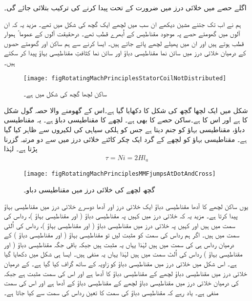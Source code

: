 اگلے حصے میں خلائی درز میں ضرورت کے تحت   پیدا کرنے کی ترکیب بتلائی جائے گی۔

ہم نے اب تک جتنے مشین دیکھے ان سب میں لچھے ایک گچھ کی شکل میں تھے۔ مزید یہ کہ ان آلوں میں گھومتے حصے پہ موجود مقناطیس کے اُبھرے قطب تھے۔ درحقیقت آلوں کے عموما ً ہموار قطب ہوتے ہیں اور ان میں پھیلے لچھے پائے جاتے ہیں۔ ایسا کرنے سے ہم ساکن اور گھومتے حصوں کے درمیان خلائی درز میں سائن نما مقناطیسی دباؤ اور سائن نما  کثافتِ مقناطیسی بہاؤ پیدا کر سکتے ہیں۔ 
\begin{figure}
\centering
\texttt{[image: figRotatingMachPrinciplesStatorCoilNotDistributed]}
\caption{ساکن لچھا گچھ کی شکل میں ہے۔}
\label{شکل_گھومتے_مشین_گچھ_لچھا}
\end{figure}

شکل   میں ایک لچھا گچھ کی شکل کا دکھایا گیا ہے۔اس کے گھومنے والا حصہ گول شکل کا ہے اور اس کا  ہے۔ساکن حصے کا بھی  ہے۔ لچھے کا مقناطیسی دباؤ  ہے۔  یہ مقناطیسی دباؤ، مقناطیسی بہاؤ   کو جنم دیتا ہے جس کو ہلکی سیاہی کی  لکیروں سے ظاہر کیا گیا ہے۔ مقناطیسی بہاؤ کو لچھے کے گرد ایک چکر کاٹتے خلائی درز میں سے دو مرتبہ گزرنا پڑتا ہے۔ لہٰذا
\begin{align}
\tau=N i=2 H l_a
\end{align}
%
\begin{figure}
\centering
\texttt{[image: figRotatingMachPrinciplesMMFjumpsAtDotAndCross]}
\caption{گچھ لچھے کی خلائی درز میں مقناطیسی دباو۔}
\label{شکل_گھومتے_مشین_گچھ_لچھے_کا_دباو}
\end{figure}

یوں ساکن لچھے کا آدھا مقناطیسی دباؤ ایک خلائی درز اور آدھا دوسرے خلائی درز میں مقناطیسی بہاؤ پیدا کرتا ہے۔ مزید یہ کہ خلائی درز میں کہیں پہ مقناطیسی دباؤ ( اور  مقناطیسی بہاؤ )،  رداس کی سمت میں ہیں اور کہیں  پہ خلائی درز میں مقناطیسی دباؤ ( اور مقناطیسی بہاؤ )، رداس کی اُلٹی سمت میں ہیں۔ اگر ہم رداس کی سمت کو مثبت لیں تو   مقناطیسی بہاؤ ( اور مقناطیسی دباؤ )  کے درمیان رداس ہی کی  سمت میں ہیں لہٰذا یہاں  یہ مثبت ہیں جبکہ باقی جگہ  مقناطیسی دباؤ ( اور مقناطیسی بہاؤ ) رداس کی اُلٹ سمت میں ہیں لہٰذا یہاں یہ منفی ہیں۔ ایسا ہی شکل   میں دکھایا گیا ہے۔ اس شکل میں خلائی درز میں مقناطیسی دباؤ کو زاویہ کے ساتھ گراف کیا گیا ہے۔ کے درمیان خلائی درز میں مقناطیسی دباؤ  لچھے کے مقناطیسی دباؤ  کا آدھا ہے اور اس کی سمت مثبت ہے جبکہ  کی درمیان خلائی درز میں مقناطیسی دباؤ لچھے کے مقناطیسی دباؤ کے آدھا ہے اور اس کی سمت منفی ہے۔ یاد رہے کہ مقناطیسی دباؤ کی سمت کا تعین رداس کی سمت سے کیا جاتا ہے۔

